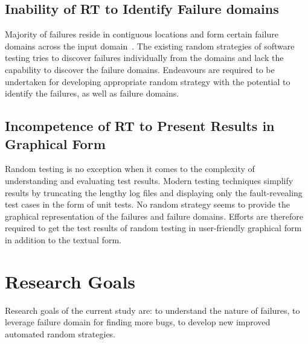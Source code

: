 \subsection{Inability of RT to Identify Failure domains}
Majority of failures reside in contiguous locations and form certain failure domains across the input domain~\cite{chan1996proportional}. The existing random strategies of software testing tries to discover failures individually from the domains and lack the capability to discover the failure domains. Endeavours are required to be undertaken for developing appropriate random strategy with the potential to identify the failures, as well as failure domains. 


\subsection{Incompetence of RT to Present Results in Graphical Form}
Random testing is no exception when it comes to the complexity of understanding and evaluating test results. Modern testing techniques simplify results by truncating the lengthy log files and displaying only the fault-revealing test cases in the form of unit tests. No random strategy seems to provide the graphical representation of the failures and failure domains. Efforts are therefore required to get the test results of random testing in user-friendly graphical form in addition to the textual form. 






\section{Research Goals}\label{ResearchGoals_1}
Research goals of the current study are: to understand the nature of failures, to leverage failure domain for finding more bugs, to develop new improved automated random strategies.

